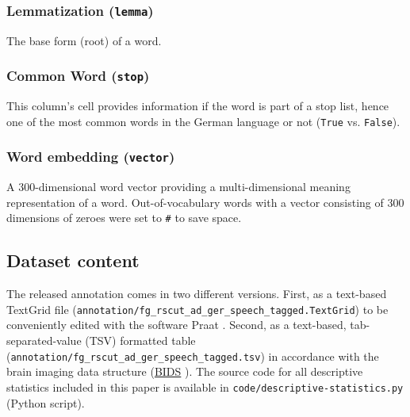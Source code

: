 \documentclass[10pt,a4paper,onecolumn]{article}
\begin{document}
\subsubsection*{Lemmatization (\texttt{lemma})}
The base form (root) of a word.


\subsubsection*{Common Word (\texttt{stop})}
This column's cell provides information if the word is part of a stop list, hence one of the most common words in the German language or not (\texttt{True} vs. \texttt{False}).


\subsubsection*{Word embedding (\texttt{vector})}
A 300-dimensional word vector providing a multi-dimensional meaning representation of a word.
Out-of-vocabulary words with a vector consisting of 300 dimensions of zeroes were set to \texttt{\#} to save space.


\subsection*{Dataset content}
The released annotation comes in two different versions. First, as a text-based TextGrid file (\texttt{annotation/fg\_rscut\_ad\_ger\_speech\_tagged.TextGrid}) to be conveniently edited with the software Praat \citep{boersma2019praat}.
Second, as a text-based, tab-separated-value (TSV) formatted table  (\texttt{annotation/fg\_rscut\_ad\_ger\_speech\_tagged.tsv}) in accordance with the brain imaging data structure (\href{https://bids.neuroimaging.io/}{BIDS} \citep{gorgolewski2016bids}).
The source code for all descriptive statistics included in this paper is available in \texttt{code/descriptive-statistics.py} (Python script).
\end{document}
